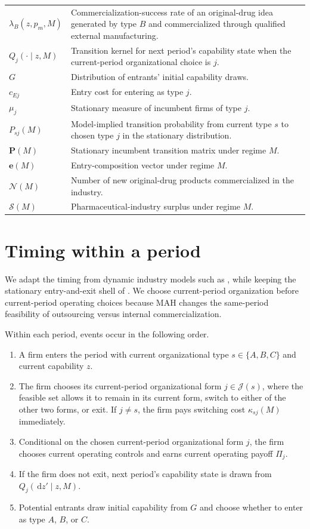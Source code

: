 \documentclass[12pt]{article}
\newcommand{\1}{\mathbf{1}}
\newcommand{\dd}{\,\mathrm{d}}
\newcommand{\Inew}{\mathcal{N}}
\newcommand{\Surp}{\mathcal{S}}
\begin{document}
\begin{table}[htbp]
\begin{tabular}{p{}p{}}
$\lambda_B(z,p_m,M)$ & Commercialization-success rate of an original-drug idea generated by type $B$ and commercialized through qualified external manufacturing. \\
$Q_j(\cdot\mid z,M)$ & Transition kernel for next period's capability state when the current-period organizational choice is $j$. \\
$G$ & Distribution of entrants' initial capability draws. \\
$c_{Ej}$ & Entry cost for entering as type $j$. \\
$\mu_j$ & Stationary measure of incumbent firms of type $j$. \\
$P_{sj}(M)$ & Model-implied transition probability from current type $s$ to chosen type $j$ in the stationary distribution. \\
$\mathbf P(M)$ & Stationary incumbent transition matrix under regime $M$. \\
$\mathbf e(M)$ & Entry-composition vector under regime $M$. \\
$\Inew(M)$ & Number of new original-drug products commercialized in the industry. \\
$\Surp(M)$ & Pharmaceutical-industry surplus under regime $M$. \\
\bottomrule
\end{tabular}
\end{table}

\section{Timing within a period}

We adapt the timing from dynamic industry models such as \citet{EricsonPakes1995}, while keeping the stationary entry-and-exit shell of \citet{Hopenhayn1992}. We choose current-period organization before current-period operating choices because MAH changes the same-period feasibility of outsourcing versus internal commercialization.

Within each period, events occur in the following order.
\begin{enumerate}[leftmargin=2em]
    \item A firm enters the period with current organizational type $s\in\{A,B,C\}$ and current capability $z$.
    \item The firm chooses its current-period organizational form $j\in\mathcal J(s)$, where the feasible set allows it to remain in its current form, switch to either of the other two forms, or exit. If $j\neq s$, the firm pays switching cost $\kappa_{sj}(M)$ immediately.
    \item Conditional on the chosen current-period organizational form $j$, the firm chooses current operating controls and earns current operating payoff $\Pi_j$.
    \item If the firm does not exit, next period's capability state is drawn from $Q_j(\dd z'\mid z,M)$.
    \item Potential entrants draw initial capability from $G$ and choose whether to enter as type $A$, $B$, or $C$.
\end{enumerate}
\end{document}
